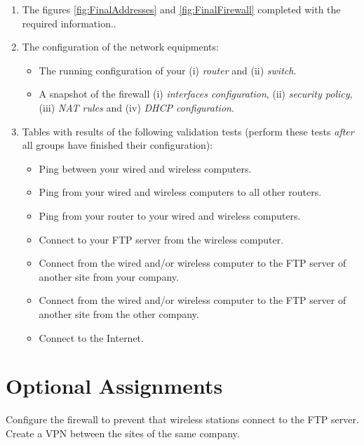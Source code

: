 \begin{enumerate}
\item The figures \ref{fig:FinalAddresses} and \ref{fig:FinalFirewall} completed with the required information..
\item The configuration of the network equipments:
\begin{itemize}
\item The running configuration of your (i) \emph{router} and (ii) \emph{switch}.
\item A snapshot of the firewall (i) \emph{interfaces configuration}, (ii) \emph{security policy}, (iii) \emph{NAT rules} and (iv) \emph{DHCP configuration}.
\end{itemize}
\item Tables with results of the following validation tests (perform these tests \emph{after} all groups have finished their configuration):
\begin{itemize}
\item Ping between your wired and wireless computers.
\item Ping from your wired and wireless computers to all other routers.
\item Ping from your router to your wired and wireless computers.
\item Connect to your FTP server from the wireless computer.
\item Connect from the wired and/or wireless computer to the FTP server of another site from your company.
\item Connect from the wired and/or wireless computer to the FTP server of another site from the other company.
\item Connect to the Internet.
\end{itemize}
\end{enumerate}

\section{Optional Assignments}

Configure the firewall to prevent that wireless stations connect to the FTP server. Create a VPN between the sites of the same company.

